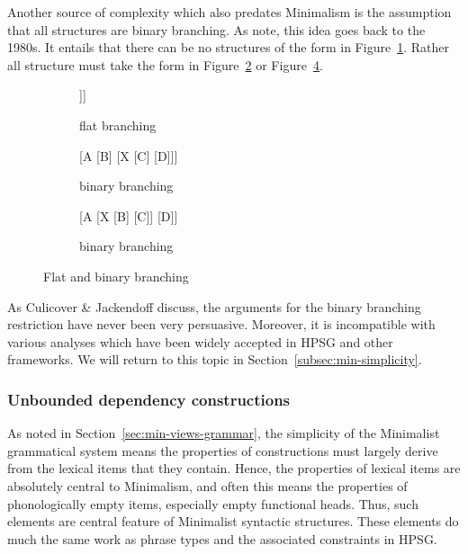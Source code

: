 \documentclass[output=paper
	        ,collection
	        ,collectionchapter
 	        ,biblatex
                ,babelshorthands
                ,newtxmath
                ,draftmode
                ,colorlinks, citecolor=brown
]{langscibook}
\begin{document}
Another source of complexity which also predates Minimalism is the assumption that
all structures are binary branching. As  \citet[112--116]{CJ2005a} note, this idea goes back to the
1980s. It entails that there can be no structures of the form in
Figure~\ref{fig:min-trinary}. Rather all structure must take the form in
Figure~\ref{fig:min-binary-a} or Figure~\ref{fig:min-binary-b}.
\begin{figure}
\hfill
\begin{subfigure}[t]{0.3\textwidth}
\centering
	\begin{forest} %
		[A
		[B][C][D [\vphantom{E},no edge]]]
	\end{forest}
\vfill
	\caption{\label{fig:min-trinary}flat branching}
\end{subfigure}
\hfill
\begin{subfigure}[t]{0.3\textwidth}
\centering
	\begin{forest} %
		[A
		  [B]
		  [X 
                    [C] 
                    [D]]]
	\end{forest}
	\caption{\label{fig:min-binary-a}binary branching}
\end{subfigure}
\hfill
\begin{subfigure}[t]{0.3\textwidth}
\centering
	\begin{forest} %
		[A
		  [X 
                    [B]
                    [C]]
		  [D]]
	\end{forest}
	\caption{\label{fig:min-binary-b}binary branching}
\end{subfigure}
\hfill\mbox{}
\caption{Flat and binary branching}
\end{figure}
%
As Culicover \& Jackendoff discuss, the arguments for the binary branching restriction have never
been very persuasive. Moreover, it is incompatible with various analyses which have been widely
accepted in HPSG and other frameworks. We will return to this topic in
Section~\ref{subsec:min-simplicity}. 


\subsubsection{Unbounded dependency constructions}
\label{minimalism-sec-empty-elements-for-relative-clauses}

As noted in Section~\ref{sec:min-views-grammar}, the simplicity of the Minimalist grammatical system
means the properties of constructions must largely derive from the lexical items that they
contain. Hence, the properties of lexical items are absolutely central to Minimalism, and often this
means the properties of phonologically empty items, especially empty functional heads. Thus, such elements are central feature of Minimalist syntactic structures. These elements do much the same work as
phrase types and the associated constraints in HPSG. 
\end{document}
